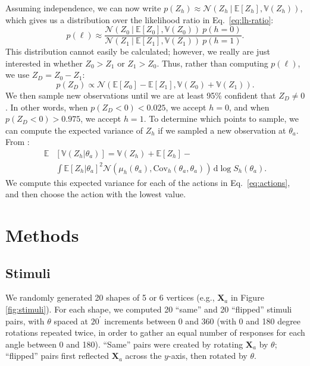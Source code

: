 \documentclass[10pt,letterpaper]{article}
\newcommand{\Xa}[0]{\mathbf{X}_a}
\newcommand{\hi}[0]{h=0}
\newcommand{\hf}[0]{h=1}
\newcommand{\dif}[0]{\,\mathrm{d}}
\begin{document}
Assuming independence, we can now write $p(Z_h)\approx\mathcal{N}(Z_h\
\vert\ \mathbb{E}[Z_h], \mathbb{V}(Z_h))$, which gives us a
distribution over the likelihood ratio in Eq.~\ref{eq:lh-ratio}:
\begin{equation}
p(\ell)\approx\frac{\mathcal{N}(Z_0\ \vert\ \mathbb{E}[Z_0], \mathbb{V}(Z_0))\ p(\hi)}{\mathcal{N}(Z_1\ \vert\ \mathbb{E}[Z_1], \mathbb{V}(Z_1))\ p(\hf)}.
\end{equation}
This distribution cannot easily be calculated; however, we really are
just interested in whether $Z_0>Z_1$ or $Z_1>Z_0$. Thus, rather than
computing $p(\ell)$, we use $Z_D=Z_0-Z_1$:
\begin{equation}
  p(Z_D)\propto\mathcal{N}(\mathbb{E}[Z_0] - \mathbb{E}[Z_1], \mathbb{V}(Z_0) + \mathbb{V}(Z_1)).
\end{equation}
We then sample new observations until we are at least 95\% confident
that $Z_D\neq 0$. In other words, when $p(Z_D<0)<0.025$, we accept
$\hi$, and when $p(Z_D<0)>0.975$, we accept $\hf$. To determine which
points to sample, we can compute the expected variance of $Z_h$ if we
sampled a new observation at $\theta_a$. From \citeA{Osborne:2012tm}:
\begin{align}
\mathbb{E}&[\mathbb{V}(Z_h|\theta_a)]=\mathbb{V}(Z_h) + \mathbb{E}[Z_h] - \\
&\int \mathbb{E}[Z_h|\theta_{a}]^2 \mathcal{N}(\mu_h(\theta_a), \mathrm{Cov}_h(\theta_a, \theta_a))\dif\log S_h(\theta_a).\nonumber
\label{ref:expected-variance}
\end{align}
We compute this expected variance for each of the actions in
Eq.~\ref{eq:actions}, and then choose the action with the lowest
value.

\section{Methods}


\subsection{Stimuli}

We randomly generated 20 shapes of 5 or 6 vertices (e.g., $\Xa$ in
Figure \ref{fig:stimuli}). For each shape, we computed 20 ``same'' and
20 ``flipped'' stimuli pairs, with $\theta$ spaced at $20^\prime$
increments between 0 and 360 (with 0 and 180 degree rotations repeated
twice, in order to gather an equal number of responses for each angle
between 0 and 180). ``Same'' pairs were created by rotating $\Xa$ by
$\theta$; ``flipped'' pairs first reflected $\Xa$ across the $y$-axis,
then rotated by $\theta$.
\end{document}
